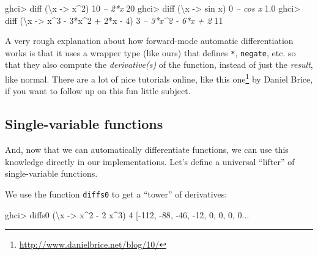 \documentclass[]{article}
\newenvironment{Shaded}{}{}
\newcommand{\DecValTok}[1]{\textcolor[rgb]{0.25,0.63,0.44}{#1}}
\newcommand{\FloatTok}[1]{\textcolor[rgb]{0.25,0.63,0.44}{#1}}
\newcommand{\CommentTok}[1]{\textcolor[rgb]{0.38,0.63,0.69}{\textit{#1}}}
\newcommand{\OtherTok}[1]{\textcolor[rgb]{0.00,0.44,0.13}{#1}}
\newcommand{\FunctionTok}[1]{\textcolor[rgb]{0.02,0.16,0.49}{#1}}
\newcommand{\NormalTok}[1]{#1}
\renewcommand{\href}[2]{#2\footnote{\url{#1}}}
\begin{document}
\begin{Shaded}
\begin{Highlighting}[]
\NormalTok{ghci}\FunctionTok{>}\NormalTok{ diff (\textbackslash{}x }\OtherTok{->}\NormalTok{ x}\FunctionTok{^}\DecValTok{2}\NormalTok{) }\DecValTok{10}       \CommentTok{-- 2*x}
\DecValTok{20}
\NormalTok{ghci}\FunctionTok{>}\NormalTok{ diff (\textbackslash{}x }\OtherTok{->}\NormalTok{ sin x) }\DecValTok{0}      \CommentTok{-- cos x}
\FloatTok{1.0}
\NormalTok{ghci}\FunctionTok{>}\NormalTok{ diff (\textbackslash{}x }\OtherTok{->}\NormalTok{ x}\FunctionTok{^}\DecValTok{3} \FunctionTok{-} \DecValTok{3}\FunctionTok{*}\NormalTok{x}\FunctionTok{^}\DecValTok{2} \FunctionTok{+} \DecValTok{2}\FunctionTok{*}\NormalTok{x }\FunctionTok{-} \DecValTok{4}\NormalTok{) }\DecValTok{3}  \CommentTok{-- 3*x^2 - 6*x + 2}
\DecValTok{11}
\end{Highlighting}
\end{Shaded}

A very rough explanation about how forward-mode automatic differentiation works
is that it uses a wrapper type (like ours) that defines \texttt{*},
\texttt{negate}, etc. so that they also compute the \emph{derivative(s)} of the
function, instead of just the \emph{result}, like normal. There are a lot of
nice tutorials online, like \href{http://www.danielbrice.net/blog/10/}{this one}
by Daniel Brice, if you want to follow up on this fun little subject.

\subsection{Single-variable functions}\label{single-variable-functions}

And, now that we can automatically differentiate functions, we can use this
knowledge directly in our implementations. Let's define a universal ``lifter''
of single-variable functions.

We use the function \texttt{diffs0} to get a ``tower'' of derivatives:

\begin{Shaded}
\begin{Highlighting}[]
\NormalTok{ghci}\FunctionTok{>}\NormalTok{ diffs0 (\textbackslash{}x }\OtherTok{->}\NormalTok{ x}\FunctionTok{^}\DecValTok{2} \FunctionTok{-} \DecValTok{2}\NormalTok{ x}\FunctionTok{^}\DecValTok{3}\NormalTok{) }\DecValTok{4}
\NormalTok{[}\FunctionTok{-}\DecValTok{112}\NormalTok{, }\FunctionTok{-}\DecValTok{88}\NormalTok{, }\FunctionTok{-}\DecValTok{46}\NormalTok{, }\FunctionTok{-}\DecValTok{12}\NormalTok{, }\DecValTok{0}\NormalTok{, }\DecValTok{0}\NormalTok{, }\DecValTok{0}\NormalTok{, }\DecValTok{0}\FunctionTok{...}
\end{Highlighting}
\end{Shaded}
\end{document}
